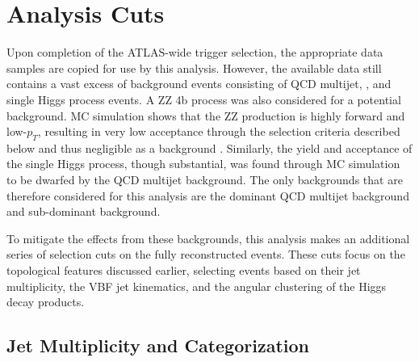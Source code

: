     \FloatBarrier
    \section{Analysis Cuts} \label{sec:analysis_cuts}

        Upon completion of the ATLAS-wide trigger selection,
            the appropriate data samples are copied for use by this analysis.
        However, the available data still contains a vast excess of background events
            consisting of QCD multijet, \ttbar, and single Higgs process events.
        A ZZ \to 4b process was also considered for a potential background.
        MC simulation shows that the ZZ production is highly forward and low-$p_T$,
            resulting in very low acceptance through the selection criteria described below
            and thus negligible as a background \cite{vbf_hh_4b_resonant_2020_int}.
        Similarly, the yield and acceptance of the single Higgs process, though substantial,
            was found through MC simulation to be dwarfed by the QCD multijet background\cite{hh4b_2021_int_note}.
        The only backgrounds that are therefore considered for this analysis are the
            dominant QCD multijet background and sub-dominant \ttbar background.

        To mitigate the effects from these backgrounds,
            this analysis makes an additional series of selection cuts on the fully reconstructed events.
        These cuts focus on the topological features discussed earlier,
            selecting events based on their jet multiplicity,
            the VBF jet kinematics,
            and the angular clustering of the Higgs decay products.

    \subsection{Jet Multiplicity and Categorization}
        
